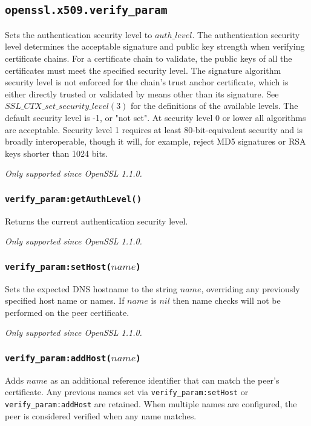\documentclass[11pt, oneside]{memoir}
\newcommand*{\fn}[1]{\texttt{#1}\xspace}
\newcounter{toccols}
\newenvironment{Module}[1]{
	\subsection{\texttt{#1}}
	\addtocontents{toc}{
		\protect\begin{multicols}{\value{toccols}}
	}
}{
	\addtocontents{toc}{\protect\end{multicols}}
}
\begin{document}
\begin{Module}{openssl.x509.verify\_param}
Sets the authentication security level to $auth\_level$. The authentication security level determines the acceptable signature and public key strength when verifying certificate chains. For a certificate chain to validate, the public keys of all the certificates must meet the specified security level. The signature algorithm security level is not enforced for the chain's trust anchor certificate, which is either directly trusted or validated by means other than its signature. See \href{https://www.openssl.org/docs/man1.1.1/man3/SSL_CTX_set_security_level.html}{$SSL\_CTX\_set\_security\_level(3)$} for the definitions of the available levels. The default security level is -1, or "not set". At security level 0 or lower all algorithms are acceptable. Security level 1 requires at least 80-bit-equivalent security and is broadly interoperable, though it will, for example, reject MD5 signatures or RSA keys shorter than 1024 bits.

\emph{Only supported since OpenSSL 1.1.0.}

\subsubsection[\fn{verify\_param:getAuthLevel}]{\fn{verify\_param:getAuthLevel()}}

Returns the current authentication security level.

\emph{Only supported since OpenSSL 1.1.0.}

\subsubsection[\fn{verify\_param:setHost}]{\fn{verify\_param:setHost($name$)}}

Sets the expected DNS hostname to the string $name$, overriding any previously specified host name or names. If $name$ is $nil$ then name checks will not be performed on the peer certificate.

\emph{Only supported since OpenSSL 1.1.0.}

\subsubsection[\fn{verify\_param:addHost}]{\fn{verify\_param:addHost($name$)}}

Adds $name$ as an additional reference identifier that can match the peer's certificate. Any previous names set via \fn{verify\_param:setHost} or \fn{verify\_param:addHost} are retained. When multiple names are configured, the peer is considered verified when any name matches.


\end{Module}
\end{document}
